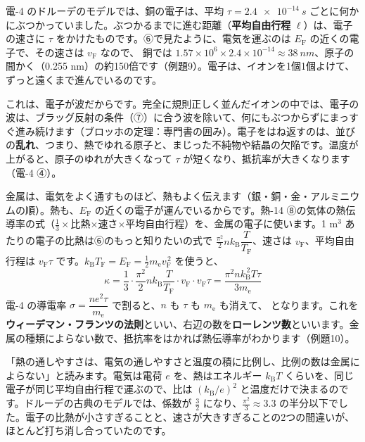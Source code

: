 
\label{ph:原-8:sec10}
電-4 のドルーデのモデルでは、銅の電子は、平均 $\tau=\qty{2.4e-14}{s}$ ごとに何かにぶつかっていました。ぶつかるまでに進む距離（\textbf{平均自由行程} $\ell$）は、電子の速さに $\tau$ をかけたものです。⑥で見たように、電気を運ぶのは $E_{\mathrm F}$ の近くの電子で、その速さは $v_{\mathrm F}$ なので、
\label{ph:原-8:mfp}銅では $1.57\times10^6\times2.4\times10^{-14}\approx\qty{38}{nm}$、原子の間かく（0.255 nm）の約150倍です（例題9）。電子は、イオンを1個1個よけて、ずっと遠くまで進んでいるのです。

これは、電子が波だからです。完全に規則正しく並んだイオンの中では、電子の波は、ブラッグ反射の条件（⑦）に合う波を除いて、何にもぶつからずにまっすぐ進み続けます（ブロッホの定理：専門書の囲み）。電子をはね返すのは、並びの\textbf{乱れ}、つまり、熱でゆれる原子と、まじった不純物や結晶の欠陥です。温度が上がると、原子のゆれが大きくなって $\tau$ が短くなり、抵抗率が大きくなります（電-4 ④）。

金属は、電気をよく通すものほど、熱もよく伝えます（銀・銅・金・アルミニウムの順）。熱も、$E_{\mathrm F}$ の近くの電子が運んでいるからです。熱-14 ⑧の気体の熱伝導率の式（$\tfrac13\times$比熱$\times$速さ$\times$平均自由行程）を、金属の電子に使います。1 m$^3$ あたりの電子の比熱は⑥のもっと知りたいの式で $\tfrac{\pi^2}{2}nk_{\mathrm B}\dfrac{T}{T_{\mathrm F}}$、速さは $v_{\mathrm F}$、平均自由行程は $v_{\mathrm F}\tau$ です。$k_{\mathrm B}T_{\mathrm F}=E_{\mathrm F}=\tfrac12m_{\mathrm e}v_{\mathrm F}^{\,2}$ を使うと、
\[ \kappa=\frac13\cdot\frac{\pi^2}{2}nk_{\mathrm B}\frac{T}{T_{\mathrm F}}\cdot v_{\mathrm F}\cdot v_{\mathrm F}\tau=\frac{\pi^2nk_{\mathrm B}^{\,2}T\tau}{3m_{\mathrm e}} \]
電-4 の導電率 $\sigma=\dfrac{ne^2\tau}{m_{\mathrm e}}$ で割ると、$n$ も $\tau$ も $m_{\mathrm e}$ も消えて、
\label{ph:原-8:WF}となります。これを\textbf{ウィーデマン・フランツの法則}といい、右辺の数を\textbf{ローレンツ数}といいます。金属の種類によらない数で、抵抗率をはかれば熱伝導率がわかります（例題10）。

\begin{phyomi}[$\kappa/(\sigma T)=\tfrac{\pi^2}{3}(k_{\mathrm B}/e)^2$]
「熱の通しやすさは、電気の通しやすさと温度の積に比例し、比例の数は金属によらない」と読みます。電気は電荷 $e$ を、熱はエネルギー $k_{\mathrm B}T$ くらいを、同じ電子が同じ平均自由行程で運ぶので、比は $(k_{\mathrm B}/e)^2$ と温度だけで決まるのです。ドルーデの古典のモデルでは、係数が $\tfrac32$ になり、$\tfrac{\pi^2}{3}\approx3.3$ の半分以下でした。電子の比熱が小さすぎることと、速さが大きすぎることの2つの間違いが、ほとんど打ち消し合っていたのです。
\end{phyomi}

